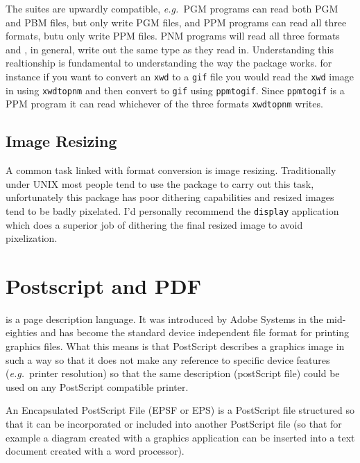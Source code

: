 \documentclass[twoside,11pt]{starlink}
\begin{document}
The suites are upwardly compatible, \emph{e.g.\ }PGM programs can read
both PGM and PBM files, but only write PGM files, and PPM programs can
read all three formats, butu only write PPM files. PNM programs will
read all three formats and , in general, write out the same type as
they read in. Understanding this realtionship is fundamental to
understanding the way the package works. for instance if you want to
convert an \texttt{xwd} to a \texttt{gif} file you would read the \texttt{xwd}
image in using \texttt{xwdtopnm} and then convert to \texttt{gif} using \texttt{ppmtogif}. Since \texttt{ppmtogif} is a PPM program it can read whichever
of the three formats \texttt{xwdtopnm} writes.

\subsection{Image Resizing\label{sc15_resizing}}

A common task linked with format conversion is image resizing.
Traditionally under UNIX most people tend to use the
 package to carry out this task, unfortunately
this package has poor dithering capabilities and resized images tend
to be badly pixelated. I'd personally recommend the
 \texttt{display} application which
does a superior job of dithering the final resized image to avoid
pixelization.

\section{Postscript and PDF\label{sc15_pspdf}}

is a page description language. It was introduced by Adobe Systems in
the mid-eighties and has become the standard device independent file
format for printing graphics files. What this means is that PostScript
describes a graphics image in such a way so that it does not make any
reference to specific device features (\emph{e.g.\ }printer resolution)
so that the same description (postScript file) could be used on any
PostScript compatible printer.

An Encapsulated PostScript File (EPSF or EPS) is a PostScript file
structured so that it can be incorporated or included into another
PostScript file (so that for example a diagram created with a graphics
application can be inserted into a text document created with a word
processor).
\end{document}
